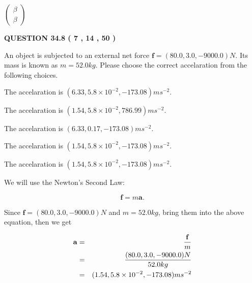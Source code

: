 \documentclass[12pt]{article}
\begin{document}
   
 $  \left( \begin{array}
 {
 c
 }
 \beta \\ 
 \beta
 \end{array} \right) $ 
  
\vspace{0.2in}
  
{\textbf{\Large{QUESTION
34.8 
 (           7 ,          14 ,          50 )
}}}
  
  
 
An object is subjected to an external net force $\mathbf{f}=
(80.0 , 3.0 , -9000.0) N$.
Its mass is known as $m= %
52.0 kg$.
Please choose the correct accelaration from the following choices.
 
 
  The accelaration is $  %
(
6.33,
5.8 \times 10^{-2},
-173.08)
ms^{-2} $.
 
 
  The accelaration is $  %
(
1.54,
5.8 \times 10^{-2},
786.99)
ms^{-2} $.
 
 
  The accelaration is $  %
(
6.33,
0.17,
-173.08)
ms^{-2} $.
 
 
  The accelaration is $  %
(
1.54,
5.8 \times 10^{-2},
-173.08)
ms^{-2} $.
 
 
\noindent{}
 
 
  The accelaration is $  %
(
1.54,
5.8 \times 10^{-2},
-173.08)
ms^{-2} $.
 
 
\noindent{}
 
 
 
 
 
\noindent{}
 
 

We will use the Newton's Second Law:
 
\[
\mathbf{f}=m\mathbf{a}.
\]
 
Since $\mathbf{f}= %
(80.0 , 3.0 , -9000.0) N$
and $m= %
52.0kg$, bring them into the above equation, then we get
 
\begin{eqnarray*}
\mathbf{a}&=&\frac{\mathbf{f}}m  \\
&=&\frac{ %
(80.0 , 3.0 , -9000.0) N}{ %
52.0kg}  \\
&=& %
(1.54 , 5.8 \times 10^{-2} , -173.08) ms^{-2}
\end{eqnarray*}
 
\end{document}
